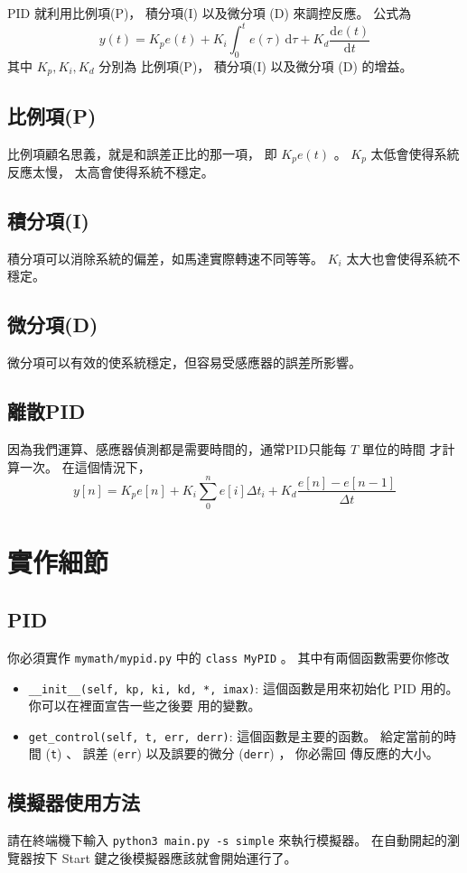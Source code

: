 \documentclass[12pt, a4paper]{article}
\newcommand{\dD}{\mathrm{d}}
\newcommand{\dI}{\,\mathrm{d}}
\begin{document}
PID 就利用比例項(P)， 積分項(I) 以及微分項 (D) 來調控反應。
公式為
\[ y(t) = K_p e(t) + K_i \int_{0}^{t} e(\tau) \dI \tau + K_d \frac{\dD e(t)}{\dD t}\]
其中 $K_p, K_i, K_d$ 分別為 比例項(P)， 積分項(I) 以及微分項 (D) 的增益。
\subsection{比例項(P)}
比例項顧名思義，就是和誤差正比的那一項， 即 $K_p e(t)$ 。
$K_p$ 太低會使得系統反應太慢， 太高會使得系統不穩定。
\subsection{積分項(I)}
積分項可以消除系統的偏差，如馬達實際轉速不同等等。
$K_i$ 太大也會使得系統不穩定。
\subsection{微分項(D)}
微分項可以有效的使系統穩定，但容易受感應器的誤差所影響。

\subsection{離散PID}
因為我們運算、感應器偵測都是需要時間的，通常PID只能每 $T$ 單位的時間
才計算一次。 在這個情況下，
\[ y[n] = K_p e[n] + K_i \sum_0^{n} e[i] \Delta t_i+ K_d \frac{e[n] - e[n-1]}{\Delta t} \]

\section{實作細節}
\subsection{PID}
你必須實作 \texttt{mymath/mypid.py} 中的 \texttt{class MyPID} 。 
其中有兩個函數需要你修改 
\begin{itemize}
  \item \texttt{__init__(self, kp, ki, kd, *, imax)}:
    這個函數是用來初始化 PID 用的。 你可以在裡面宣告一些之後要
    用的變數。

  \item \texttt{get_control(self, t, err, derr)}:
    這個函數是主要的函數。 給定當前的時間 (\texttt{t}) 、 誤差
    (\texttt{err}) 以及誤要的微分 (\texttt{derr}) ， 你必需回
    傳反應的大小。
\end{itemize}

\subsection{模擬器使用方法}
請在終端機下輸入 \texttt{python3 main.py -s simple} 來執行模擬器。
在自動開起的瀏覽器按下 Start 鍵之後模擬器應該就會開始運行了。
\end{document}
